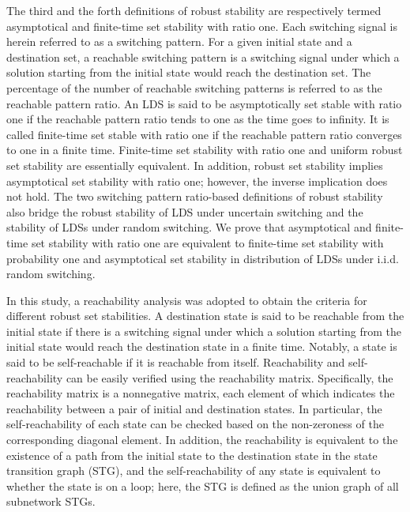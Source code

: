 \documentclass[11pt,onecolumn]{article}
\begin{document}
The third and the forth definitions of robust stability are respectively termed asymptotical and finite-time set stability with ratio one. Each switching signal is herein referred to as a switching pattern. For a given initial state and a destination set, a reachable switching pattern is a switching signal under which a solution starting from the initial state would reach the destination set. The percentage of the number of reachable switching patterns is referred to as the reachable pattern ratio. An LDS is said to be asymptotically set stable with ratio one if the reachable pattern ratio tends to one as the time goes to infinity. It is called finite-time set stable with ratio one if the reachable pattern ratio converges to one in a finite time. Finite-time set stability with ratio one and uniform robust set stability are essentially equivalent. In addition, robust set stability implies asymptotical set stability with ratio one; however, the inverse implication does not hold. The two switching pattern ratio-based definitions of robust stability also bridge the robust stability of LDS under uncertain switching and the stability of LDSs under random switching. We prove that asymptotical and finite-time set stability with ratio one are equivalent to finite-time set stability with probability one and asymptotical set stability in distribution of LDSs under i.i.d. random switching.



In this study, a reachability analysis was adopted to obtain the criteria for different robust set stabilities. A destination state is said to be reachable from the initial state if there is a switching signal under which a solution starting from the initial state would reach the destination state in a finite time.  Notably, a state is said to be self-reachable if it is reachable from itself. Reachability and self-reachability can be easily verified using the reachability matrix. Specifically, the reachability matrix is a nonnegative matrix, each element of which indicates the reachability between a pair of initial and destination states. In particular, the self-reachability of each state can be checked based on the non-zeroness of the corresponding diagonal element. In addition, the reachability is equivalent to the existence of a path from the initial state to the destination state in the state transition graph (STG), and the self-reachability of any state is equivalent to whether the state is on a loop; here, the STG is defined as the union graph of all subnetwork STGs.
\end{document}
